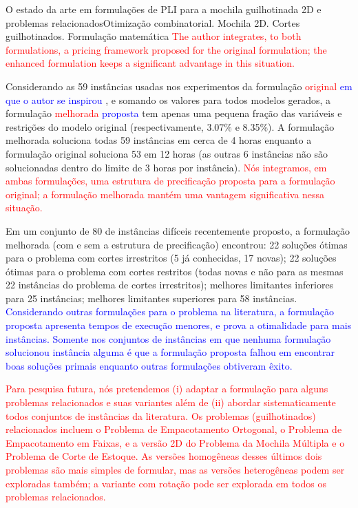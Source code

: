 \documentclass[ppgc,tese,english,formais,babel]{iiufrgs}
\newif\iffinalversion
\newcommand{\newtext}[1]{\iffinalversion%
#1%
\else%
\textcolor{blue}{#1}%
\fi%
}
\newcommand{\oldtext}[1]{\iffinalversion%
\else%
\textcolor{red}{#1}%
\fi%
}
\begin{document}
\begin{englishabstract}{O estado da arte em formulações de PLI para a mochila guilhotinada 2D e problemas relacionados}{Otimização combinatorial. Mochila 2D. Cortes guilhotinados. Formulação matemática}
\oldtext{The author integrates, to both formulations, a pricing framework proposed for the original formulation; the enhanced formulation keeps a significant advantage in this situation.}
Considerando as 59 instâncias usadas nos experimentos da formulação \oldtext{original}\newtext{em que o autor se inspirou}, e somando os valores para todos modelos gerados, a formulação \oldtext{melhorada}\newtext{proposta} tem apenas uma pequena fração das variáveis e restrições do modelo original (respectivamente, 3.07\% e 8.35\%).
A formulação melhorada soluciona todas 59 instâncias em cerca de 4 horas enquanto a formulação original soluciona 53 em 12 horas (as outras 6 instâncias não são solucionadas dentro do limite de 3 horas por instância).
\oldtext{Nós integramos, em ambas formulações, uma estrutura de precificação proposta para a formulação original; a formulação melhorada mantém uma vantagem significativa nessa situação.}
Em um conjunto de 80 de instâncias difíceis recentemente proposto, a formulação melhorada (com e sem a estrutura de precificação) encontrou: 22 soluções ótimas para o problema com cortes irrestritos (5 já conhecidas, 17 novas); 22 soluções ótimas para o problema com cortes restritos (todas novas e não para as mesmas 22 instâncias do problema de cortes irrestritos); melhores limitantes inferiores para 25 instâncias; melhores limitantes superiores para 58 instâncias.
\newtext{Considerando outras formulações para o problema na literatura, a formulação proposta apresenta tempos de execução menores, e prova a otimalidade para mais instâncias.
Somente nos conjuntos de instâncias em que nenhuma formulação solucionou instância alguma é que a formulação proposta falhou em encontrar boas soluções primais enquanto outras formulações obtiveram êxito.
}

\oldtext{
Para pesquisa futura, nós pretendemos (i) adaptar a formulação para alguns problemas relacionados e suas variantes além de (ii) abordar sistematicamente todos conjuntos de instâncias da literatura.
Os problemas (guilhotinados) relacionados incluem o Problema de Empacotamento Ortogonal, o Problema de Empacotamento em Faixas, e a versão 2D do Problema da Mochila Múltipla e o Problema de Corte de Estoque.
As versões homogêneas desses últimos dois problemas são mais simples de formular, mas as versões heterogêneas podem ser exploradas também; a variante com rotação pode ser explorada em todos os problemas relacionados.
}
\end{englishabstract}

\end{document}
